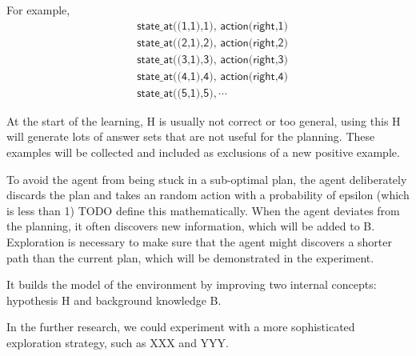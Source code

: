 For example,
\begin{equation*}
\begin{split}
&\textsf{state\_at((1,1),1), action(right,1)}\\
&\textsf{state\_at((2,1),2), action(right,2)}\\
&\textsf{state\_at((3,1),3), action(right,3)}\\
&\textsf{state\_at((4,1),4), action(right,4)}\\
&\textsf{state\_at((5,1),5)}, \cdots
\end{split}
\end{equation*}

At the start of the learning, H is usually not correct or too general, using this H will generate lots of answer sets that are not useful for the planning.
These examples will be collected and included as exclusions of a new positive example.

To avoid the agent from being stuck in a sub-optimal plan, the agent deliberately discards the plan and takes an random action with a probability of
epsilon (which is less than 1) TODO define this mathematically.
When the agent deviates from the planning, it often discovers new information, which will be added to B.
Exploration is necessary to make sure that the agent might discovers a shorter path than the current plan, which will be demonstrated in the experiment.

It builds the model of the environment by improving two internal concepts: hypothesis H and background knowledge B.

In the further research, we could experiment with a more sophisticated exploration strategy, such as XXX and YYY.



